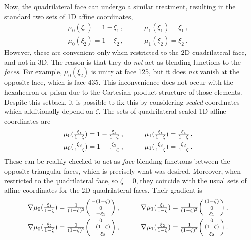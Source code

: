 Now, the quadrilateral face can undergo a similar treatment, resulting in the standard two sets of 1D affine coordinates,
\begin{equation*}
	\begin{gathered}
		\mu_0(\xi_1)=1-\xi_1\,,\quad\qquad\mu_1(\xi_1)=\xi_1\,,\\
		\mu_0(\xi_2)=1-\xi_2\,,\quad\qquad\mu_1(\xi_2)=\xi_2\,.
	\end{gathered}
\end{equation*}
However, these are convenient only when restricted to the 2D quadrilateral face, and not in 3D.
The reason is that they do \textit{not} act as blending functions to the \textit{faces}.
For example, $\mu_0(\xi_2)$ is unity at face 125, but it does \textit{not} vanish at the opposite face, which is face 435.
This inconvenience does not occur with the hexahedron or prism due to the Cartesian product structure of those elements.
Despite this setback, it is possible to fix this by considering \textit{scaled} coordinates which additionally depend on $\zeta$.
The sets of quadrilateral scaled 1D affine coordinates are
\begin{equation}
	\begin{gathered}
		\mu_0(\textstyle{\frac{\xi_1}{1-\zeta}})=1-\textstyle{\frac{\xi_1}{1-\zeta}}\,,\quad\qquad\mu_1(\textstyle{\frac{\xi_1}{1-\zeta}})=\textstyle{\frac{\xi_1}{1-\zeta}}\,,\\
		\mu_0(\textstyle{\frac{\xi_2}{1-\zeta}})=1-\textstyle{\frac{\xi_2}{1-\zeta}}\,,\quad\qquad\mu_1(\textstyle{\frac{\xi_2}{1-\zeta}})=\textstyle{\frac{\xi_2}{1-\zeta}}\,.
	\end{gathered}
	\label{eq:PyramidQuadCoord}
\end{equation}
These can be readily checked to act as \textit{face} blending functions between the opposite triangular faces, which is precisely what was desired.
Moreover, when restricted to the quadrilateral face, so $\zeta=0$, they coincide with the usual sets of affine coordinates for the 2D quadrilateral faces.
Their gradient is
\begin{equation}
	\begin{gathered}
		\nabla\mu_0(\textstyle{\frac{\xi_1}{1-\zeta}})=\frac{1}{(1-\zeta)^2}\bigg(\begin{smallmatrix}-(1-\zeta)\\[2pt]0\\[2pt]-\xi_1\end{smallmatrix}\bigg)\,,\quad\qquad
    	\nabla\mu_1(\textstyle{\frac{\xi_1}{1-\zeta}})=\frac{1}{(1-\zeta)^2}\bigg(\begin{smallmatrix}(1-\zeta)\\[2pt]0\\[2pt]\xi_1\end{smallmatrix}\bigg)\,,\\
		\nabla\mu_0(\textstyle{\frac{\xi_2}{1-\zeta}})=\frac{1}{(1-\zeta)^2}\bigg(\begin{smallmatrix}0\\[2pt]-(1-\zeta)\\[2pt]-\xi_2\end{smallmatrix}\bigg)\,,\quad\qquad
    	\nabla\mu_1(\textstyle{\frac{\xi_2}{1-\zeta}})=\frac{1}{(1-\zeta)^2}\bigg(\begin{smallmatrix}0\\[2pt](1-\zeta)\\[2pt]\xi_2\end{smallmatrix}\bigg)\,.
	\end{gathered}
	\label{eq:PyramidQuadCoordGrad}
\end{equation}

